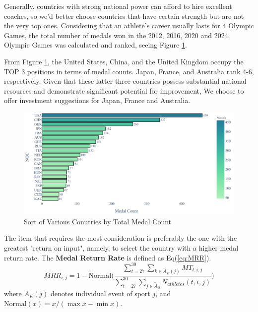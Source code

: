 \documentclass{mcmthesis}
\begin{document}
Generally, countries with strong national power can afford to hire excellent coaches, so we'd better choose countries that have certain strength but are not the very top ones. Considering that an athlete's career usually lasts for 4 Olympic Games, the total number of medals won in the 2012, 2016, 2020 and 2024 Olympic Games was calculated and ranked, seeing Figure \ref{fig:medal_count_by_noc}.

From Figure \ref{fig:medal_count_by_noc}, the United States, China, and the United Kingdom occupy the TOP 3 positions in terms of medal counts. Japan, France, and Australia rank 4-6, respectively. Given that these latter three countries possess substantial national resources and demonstrate significant potential for improvement, We choose to offer investment suggestions for Japan, France and Australia.

\begin{figure}[H]
	\centering
	\includegraphics[width=1\linewidth]{fig/Medal_Count_by_NOC.png}
	\caption{Sort of Various Conutries by Total Medal Count}
	\label{fig:medal_count_by_noc}
\end{figure}






The item that requires the most consideration is preferably the one with the greatest "return on input", namely, to select the country with a higher medal return rate. The \textbf{Medal Return Rate} is defined as Eq(\ref{eq:MRR}).
\begin{equation}
	MRR_{i,j}=1-\text{Normal}
	\Bigg( 
	\frac{ \sum_{t=27}^{30} \sum_{k\in \tilde{A}_{E}(j)} MT_{t,i,j} }{ \sum_{t=27}^{30} \sum_{j\in \tilde{A}_{S}} N_{athletes}(t,i,j) }
	\Bigg)
	\label{eq:MRR}
\end{equation}
where $\tilde{A}_{E}(j)$ denotes individual event of sport $j$, and $\text{Normal}(x)=x/(\max{x} - \min{x})$. 
\end{document}
